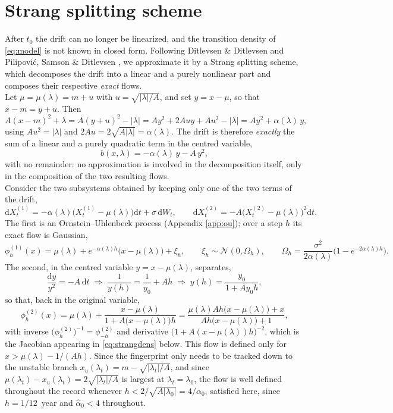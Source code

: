 \documentclass[12pt,a4paper]{article}
\theoremstyle{definition}
\theoremstyle{plain}
\newcommand{\dd}{\mathrm{d}}
\begin{document}
\section{Strang splitting scheme}
\label{app:strang}
 

After $t_0$ the drift can no longer be linearized, and the transition density of
\eqref{eq:model} is not known in closed form. Following Ditlevsen \& Ditlevsen
\cite{ditlevsen2023} and Pilipovi\'c, Samson \& Ditlevsen \cite{pilipovic2024}, we approximate
it by a Strang splitting scheme, which decomposes the drift into a linear and a purely
nonlinear part and composes their respective \emph{exact} flows. \\
 
\noindent Let $\mu=\mu(\lambda)=m+u$ with $u=\sqrt{|\lambda|/A}$, and set $y=x-\mu$, so that
$x-m=y+u$. Then
\[
A(x-m)^2+\lambda=A(y+u)^2-|\lambda|=Ay^2+2Auy+Au^2-|\lambda|=Ay^2+\alpha(\lambda)\,y ,
\]
using $Au^2=|\lambda|$ and $2Au=2\sqrt{A|\lambda|}=\alpha(\lambda)$. The drift is therefore
\emph{exactly} the sum of a linear and a purely quadratic term in the centred variable,
\[
b(x,\lambda)=-\alpha(\lambda)\,y-A\,y^2 ,
\]
with no remainder: no approximation is involved in the decomposition itself, only in the
composition of the two resulting flows. \\
 
\noindent Consider the two subsystems obtained by keeping only one of the two terms of the drift,
\[
\dd X_t^{(1)}=-\alpha(\lambda)\big(X_t^{(1)}-\mu(\lambda)\big)\dd t+\sigma\,\dd W_t,
\qquad
\dd X_t^{(2)}=-A\big(X_t^{(2)}-\mu(\lambda)\big)^2\dd t .
\]
The first is an Ornstein--Uhlenbeck process (Appendix \ref{app:ou}); over a step $h$ its exact
flow is Gaussian,
\[
\phi^{(1)}_h(x)=\mu(\lambda)+e^{-\alpha(\lambda)h}\big(x-\mu(\lambda)\big)+\xi_h,
\qquad \xi_h\sim\mathcal N(0,\Omega_h),\qquad
\Omega_h=\frac{\sigma^2}{2\alpha(\lambda)}\big(1-e^{-2\alpha(\lambda)h}\big).
\]
The second, in the centred variable $y=x-\mu(\lambda)$, separates,
\[
\frac{\dd y}{y^2}=-A\,\dd t \;\Longrightarrow\; \frac1{y(h)}=\frac1{y_0}+Ah
\;\Longrightarrow\; y(h)=\frac{y_0}{1+Ay_0h},
\]
so that, back in the original variable,
\[
\phi^{(2)}_h(x)=\mu(\lambda)+\frac{x-\mu(\lambda)}{1+A\big(x-\mu(\lambda)\big)h}
=\frac{\mu(\lambda)Ah\big(x-\mu(\lambda)\big)+x}{Ah\big(x-\mu(\lambda)\big)+1} ,
\]
with inverse $\big(\phi^{(2)}_h\big)^{-1}=\phi^{(2)}_{-h}$ and derivative
$\big(1+A(x-\mu(\lambda))h\big)^{-2}$, which is the Jacobian appearing in
\eqref{eq:strangdens} below. This flow is defined only for $x>\mu(\lambda)-1/(Ah)$. Since the
fingerprint only needs to be tracked down to the unstable branch
$x_u(\lambda_t)=m-\sqrt{|\lambda_t|/A}$, and since
$\mu(\lambda_t)-x_u(\lambda_t)=2\sqrt{|\lambda_t|/A}$ is largest at $\lambda_t=\lambda_0$, the
flow is well defined throughout the record whenever
$h<2/\sqrt{A|\lambda_0|}=4/\alpha_0$, satisfied here, since $h=1/12$~year and
$\hat\alpha_0<4$ throughout. \\
 
\end{document}
